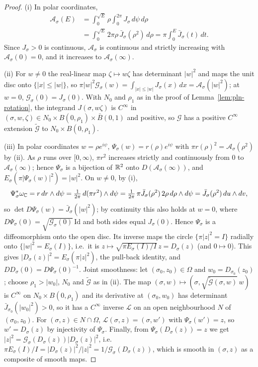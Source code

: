 \begin{proof}
(i) In polar coordinates,
\begin{align*}
 \mathcal A_\sigma(E)&=\int_0^{\sqrt E}\rho\int_0^{2\pi}J_\sigma\,d\psi\,d\rho\\
 &=\int_0^{\sqrt E}2\pi\rho\,\bar J_\sigma(\rho^2)\,d\rho
 =\pi\int_0^E\bar J_\sigma(t)\,dt.
\end{align*}
Since $J_\sigma>0$ is continuous, $\mathcal A_\sigma$ is continuous and strictly
increasing with $\mathcal A_\sigma(0)=0$, and it increases to $\mathcal A_\sigma(\infty)$.

(ii) For $w\ne0$ the real-linear map $\zeta\mapsto w\zeta$ has determinant $|w|^2$ and maps the unit disc
onto $\{|x|\le|w|\}$, so $\pi|w|^2\mathcal G_\sigma(w)=\int_{|x|\le|w|}J_\sigma(x)\,dx=\mathcal A_\sigma(|w|^2)$; at $w=0$,
$\mathcal G_\sigma(0)=J_\sigma(0)$. With $N_0$ and $\rho_1$ as in the proof of Lemma~\ref{lem:pln-rotation}, the
integrand $J(\sigma,w\zeta)$ is $C^\infty$ in $(\sigma,w,\zeta)\in N_0\times B(0,\rho_1)\times\bar B(0,1)$ and positive,
so $\mathcal G$ has a positive $C^\infty$ extension $\tilde{\mathcal G}$ to $N_0\times B(0,\rho_1)$.

(iii) In polar coordinates $w=\rho e^{i\psi}$, $\Psi_\sigma(w)=r(\rho)e^{i\psi}$ with
$\pi r(\rho)^2=\mathcal A_\sigma(\rho^2)$ by (ii). As $\rho$ runs over $[0,\infty)$, $\pi r^2$ increases strictly and
continuously from $0$ to $\mathcal A_\sigma(\infty)$; hence $\Psi_\sigma$ is a bijection of $\mathbb{R}^2$ onto
$D(\mathcal A_\sigma(\infty))$, and $E_\sigma(\pi|\Psi_\sigma(w)|^2)=|w|^2$. On $w\ne0$, by (i),
\[
 \Psi_\sigma^*\omega_{\mathbb{C}}=r\,dr\wedge d\psi=\tfrac1{2\pi}\,d(\pi r^2)\wedge d\psi
 =\tfrac1{2\pi}\,\pi\bar J_\sigma(\rho^2)\,2\rho\,d\rho\wedge d\psi=\bar J_\sigma(\rho^2)\,du\wedge dv ,
\]
so $\det D\Psi_\sigma(w)=\bar J_\sigma(|w|^2)$; by continuity this also holds at $w=0$, where
$D\Psi_\sigma(0)=\sqrt{\mathcal G_\sigma(0)}\,\mathrm{Id}$ and both sides equal $J_\sigma(0)$. Hence $\Psi_\sigma$ is a
diffeomorphism onto the open disc. Its inverse maps the circle $\{\pi|z|^2=I\}$ radially onto
$\{|w|^2=E_\sigma(I)\}$, i.e.\ it is $z\mapsto\sqrt{\pi E_\sigma(I)/I}\,z=D_\sigma(z)$ (and $0\mapsto0$). This gives
$|D_\sigma(z)|^2=E_\sigma(\pi|z|^2)$, the pull-back identity, and $DD_\sigma(0)=D\Psi_\sigma(0)^{-1}$. Joint smoothness:
let $(\sigma_0,z_0)\in\Omega$ and $w_0=D_{\sigma_0}(z_0)$; choose $\rho_1>|w_0|$, $N_0$ and $\tilde{\mathcal G}$ as in (ii). The map
$(\sigma,w)\mapsto(\sigma,\sqrt{\tilde{\mathcal G}(\sigma,w)}\,w)$ is $C^\infty$ on $N_0\times B(0,\rho_1)$ and its derivative at
$(\sigma_0,w_0)$ has determinant $\bar J_{\sigma_0}(|w_0|^2)>0$, so it has a $C^\infty$ inverse $\mathcal L$ on an open
neighbourhood $N$ of $(\sigma_0,z_0)$. For $(\sigma,z)\in N\cap\Omega$, $\mathcal L(\sigma,z)=(\sigma,w')$ with
$\Psi_\sigma(w')=z$, so $w'=D_\sigma(z)$ by injectivity of $\Psi_\sigma$. Finally, from $\Psi_\sigma(D_\sigma(z))=z$ we get
$|z|^2=\mathcal G_\sigma(D_\sigma(z))|D_\sigma(z)|^2$, i.e.\ $\pi E_\sigma(I)/I=|D_\sigma(z)|^2/|z|^2=1/\mathcal G_\sigma(D_\sigma(z))$, which is smooth
in $(\sigma,z)$ as a composite of smooth maps.


\end{proof}
